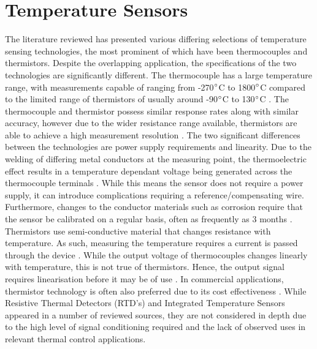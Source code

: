 \section{Temperature Sensors}
The literature reviewed has presented various differing selections of temperature sensing technologies, the most prominent of which have been thermocouples and thermistors. Despite the overlapping application, the specifications of the two technologies are significantly different. The thermocouple has a large temperature range, with measurements capable of ranging from -270$\degree$C to 1800$\degree$C compared to the limited range of thermistors of usually around -90$\degree$C to 130$\degree$C \cite{11303490}\cite{15156909}\cite{10650397}. The thermocouple and thermistor possess similar response rates along with similar accuracy, however due to the wider resistance range available, thermistors are able to achieve a high measurement resolution \cite{11303490}\cite{15156909}\cite{10650397}. The two significant differences between the technologies are power supply requirements and linearity. Due to the welding of differing metal conductors at the measuring point, the thermoelectric effect results in a temperature dependant voltage being generated across the thermocouple terminals \cite{11303490}\cite{10650397}\cite{15156909}. While this means the sensor does not require a power supply, it can introduce complications requiring a reference/compensating wire. Furthermore, changes to the conductor materials such as corrosion require that the sensor be calibrated on a regular basis, often as frequently as 3 months \cite{11303490}\cite{15156909}\cite{10650397}. Thermistors use semi-conductive material that changes resistance with temperature. As such, measuring the temperature requires a current is passed through the device \cite{11303490}\cite{15156909}. While the output voltage of thermocouples changes linearly with temperature, this is not true of thermistors. Hence, the output signal requires linearisation before it may be of use \cite{15156909}. In commercial applications, thermistor technology is often also preferred due to its cost effectiveness \cite{10650397}. While Resistive Thermal Detectors (RTD's) and Integrated Temperature Sensors appeared in a number of reviewed sources, they are not considered in depth due to the high level of signal conditioning required \cite{10650397}\cite{11303490} and the lack of observed uses in relevant thermal control applications.

